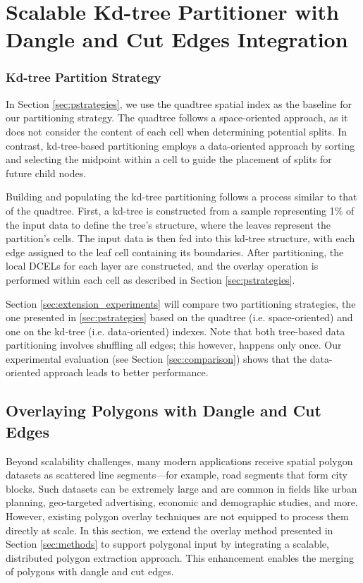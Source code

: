 \section{Scalable Kd-tree Partitioner with Dangle and Cut Edges Integration} \label{sec:extension_methods}

\subsubsection{Kd-tree Partition Strategy} %
In Section \ref{sec:pstrategies}, we use the quadtree spatial index as the baseline for our partitioning strategy. The quadtree follows a space-oriented approach, as it does not consider the content of each cell when determining potential splits. In contrast, kd-tree-based partitioning employs a data-oriented approach by sorting and selecting the midpoint within a cell to guide the placement of splits for future child nodes.

Building and populating the kd-tree partitioning follows a process similar to that of the quadtree. First, a kd-tree is constructed from a sample representing 1\% of the input data to define the tree’s structure, where the leaves represent the partition’s cells. The input data is then fed into this kd-tree structure, with each edge assigned to the leaf cell containing its boundaries. After partitioning, the local DCELs for each layer are constructed, and the overlay operation is performed within each cell as described in Section \ref{sec:pstrategies}.

Section \ref{sec:extension_experiments} will compare two partitioning strategies, the one presented in \ref{sec:pstrategies} based on the quadtree (i.e. space-oriented) and one on the kd-tree (i.e. data-oriented) indexes.  Note that both tree-based data partitioning involves shuffling all edges; this however, happens only once. Our experimental evaluation (see Section \ref{sec:comparison}) shows that the data-oriented approach leads to better performance. 

\subsection{Overlaying Polygons with Dangle and Cut Edges} \label{sec:over_dang}

Beyond scalability challenges, many modern applications receive spatial polygon datasets as scattered line segments—for example, road segments that form city blocks. Such datasets can be extremely large and are common in fields like urban planning, geo-targeted advertising, economic and demographic studies, and more. However, existing polygon overlay techniques are not equipped to process them directly at scale. In this section, we extend the overlay method presented in Section \ref{sec:methods} to support polygonal input by integrating a scalable, distributed polygon extraction approach. This enhancement enables the merging of polygons with dangle and cut edges.

